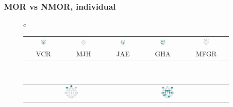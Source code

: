 \documentclass{beamer}
\begin{document}
\begin{frame}\frametitle{MOR vs NMOR, individual}
\begin{figure}
\centering
\begin{tabular}{c}
\begin{tabular}{ccccc}
\includegraphics[width=0.15\textwidth]{./cabecitas/cabecita_VCR.pdf} &
\includegraphics[width=0.15\textwidth]{./cabecitas/cabecita_MJH.pdf} &
\includegraphics[width=0.15\textwidth]{./cabecitas/cabecita_JAE.pdf} &
\includegraphics[width=0.15\textwidth]{./cabecitas/cabecita_GHA.pdf} &
\includegraphics[width=0.15\textwidth]{./cabecitas/cabecita_MFGR.pdf} \\
VCR & MJH & JAE & GHA & MFGR
\end{tabular}
\\
\begin{tabular}{cccc}
\includegraphics[width=0.15\textwidth]{./cabecitas/cabecita_CLO.pdf} &
\includegraphics[width=0.15\textwidth]{./cabecitas/cabecita_RLO.pdf} &

\end{tabular}
\end{tabular}
\end{figure}
\end{frame}
\end{document}
